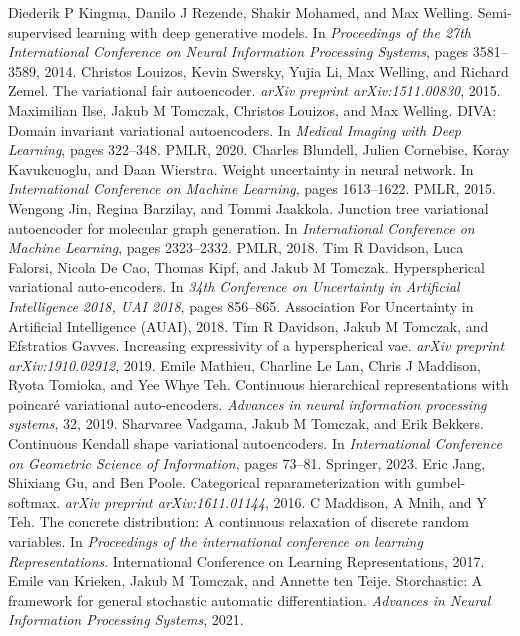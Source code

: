 \begin{chapterreferences}
 Diederik P Kingma, Danilo J Rezende, Shakir Mohamed, and Max Welling. Semi-supervised learning with deep generative models. In \textit{Proceedings of the 27th International Conference on Neural Information Processing Systems}, pages 3581–3589, 2014.
 Christos Louizos, Kevin Swersky, Yujia Li, Max Welling, and Richard Zemel. The variational fair autoencoder. \textit{arXiv preprint arXiv:1511.00830}, 2015.
 Maximilian Ilse, Jakub M Tomczak, Christos Louizos, and Max Welling. DIVA: Domain invariant variational autoencoders. In \textit{Medical Imaging with Deep Learning}, pages 322–348. PMLR, 2020.
 Charles Blundell, Julien Cornebise, Koray Kavukcuoglu, and Daan Wierstra. Weight uncertainty in neural network. In \textit{International Conference on Machine Learning}, pages 1613–1622. PMLR, 2015.
 Wengong Jin, Regina Barzilay, and Tommi Jaakkola. Junction tree variational autoencoder for molecular graph generation. In \textit{International Conference on Machine Learning}, pages 2323–2332. PMLR, 2018.
 Tim R Davidson, Luca Falorsi, Nicola De Cao, Thomas Kipf, and Jakub M Tomczak. Hyperspherical variational auto-encoders. In \textit{34th Conference on Uncertainty in Artificial Intelligence 2018, UAI 2018}, pages 856–865. Association For Uncertainty in Artificial Intelligence (AUAI), 2018.
 Tim R Davidson, Jakub M Tomczak, and Efstratios Gavves. Increasing expressivity of a hyperspherical vae. \textit{arXiv preprint arXiv:1910.02912}, 2019.
 Emile Mathieu, Charline Le Lan, Chris J Maddison, Ryota Tomioka, and Yee Whye Teh. Continuous hierarchical representations with poincaré variational auto-encoders. \textit{Advances in neural information processing systems}, 32, 2019.
 Sharvaree Vadgama, Jakub M Tomczak, and Erik Bekkers. Continuous Kendall shape variational autoencoders. In \textit{International Conference on Geometric Science of Information}, pages 73–81. Springer, 2023.
 Eric Jang, Shixiang Gu, and Ben Poole. Categorical reparameterization with gumbel-softmax. \textit{arXiv preprint arXiv:1611.01144}, 2016.
 C Maddison, A Mnih, and Y Teh. The concrete distribution: A continuous relaxation of discrete random variables. In \textit{Proceedings of the international conference on learning Representations}. International Conference on Learning Representations, 2017.
 Emile van Krieken, Jakub M Tomczak, and Annette ten Teije. Storchastic: A framework for general stochastic automatic differentiation. \textit{Advances in Neural Information Processing Systems}, 2021.

\end{chapterreferences}
